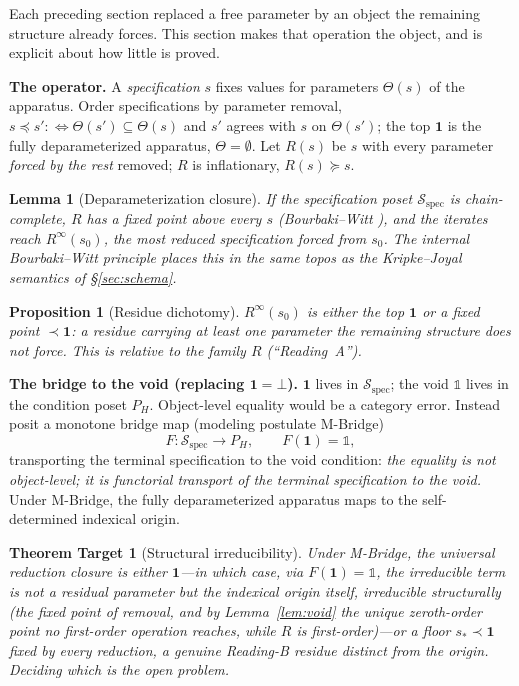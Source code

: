 \documentclass[11pt]{article}
\newtheorem{proposition}{Proposition}
\newtheorem{lemma}{Lemma}
\newtheorem*{theoremtarget}{Theorem Target}
\theoremstyle{definition}
\theoremstyle{remark}
\newcommand{\Sspec}{\mathcal{S}_{\mathrm{spec}}}
\begin{document}
Each preceding section replaced a free parameter by an object the remaining structure already forces.
This section makes that operation the object, and is explicit about how little is proved.

\medskip\noindent\textbf{The operator.} A \emph{specification} $s$ fixes values for parameters
$\Theta(s)$ of the apparatus. Order specifications by parameter removal,
$s \preceq s' :\Longleftrightarrow \Theta(s')\subseteq\Theta(s)$ and $s'$ agrees with $s$ on
$\Theta(s')$; the top $\mathbf{1}$ is the fully deparameterized apparatus, $\Theta=\emptyset$. Let
$R(s)$ be $s$ with every parameter \emph{forced by the rest} removed; $R$ is inflationary,
$R(s)\succeq s$.

\begin{lemma}[Deparameterization closure]\label{lem:bw}
If the specification poset $\Sspec$ is chain-complete, $R$ has a fixed point above every $s$
(Bourbaki--Witt \cite{bourbaki-witt}), and the iterates reach $R^\infty(s_0)$, the most reduced
specification forced from $s_0$. The internal Bourbaki--Witt principle \cite{bw-topos} places this in
the same topos as the Kripke--Joyal semantics of \S\ref{sec:schema}.
\end{lemma}

\begin{proposition}[Residue dichotomy]\label{prop:dich}
$R^\infty(s_0)$ is either the top $\mathbf{1}$ or a fixed point $\prec\mathbf{1}$: a \emph{residue}
carrying at least one parameter the remaining structure does not force. This is relative to the family
$R$ (``Reading~A'').
\end{proposition}

\medskip\noindent\textbf{The bridge to the void (replacing $\mathbf{1}=\bot$).} $\mathbf{1}$ lives in
$\Sspec$; the void $\mathbb{1}$ lives in the condition poset $P_H$. Object-level equality would be a
category error. Instead posit a monotone bridge map (modeling postulate M-Bridge)
\[
  F:\Sspec\to P_H,\qquad F(\mathbf{1})=\mathbb{1},
\]
transporting the terminal specification to the void condition: \emph{the equality is not object-level;
it is functorial transport of the terminal specification to the void.} Under M-Bridge, the fully
deparameterized apparatus maps to the self-determined indexical origin.

\begin{theoremtarget}[Structural irreducibility]
Under M-Bridge, the universal reduction closure is either $\mathbf{1}$---in which case, via
$F(\mathbf{1})=\mathbb{1}$, the irreducible term is not a residual parameter but the indexical origin
itself, irreducible structurally (the fixed point of removal, and by Lemma~\ref{lem:void} the unique
zeroth-order point no first-order operation reaches, while $R$ is first-order)---or a floor
$s_*\prec\mathbf{1}$ fixed by every reduction, a genuine Reading-B residue distinct from the origin.
Deciding which is the open problem.
\end{theoremtarget}
\end{document}
